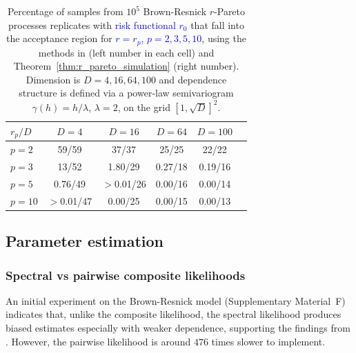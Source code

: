 \documentclass[12pt]{article}
\newcommand{\PZ}{\textcolor{blue}}
\begin{document}
\begin{table}[ht]
    \centering
    \caption{\small Percentage of samples from $10^5$ Brown-Resnick $r$-Pareto processes replicates with \PZ{risk functional $r_0$} that fall into the acceptance region for \PZ{$r=r_p$, $p=2,3,5,10$}, using the methods in \citet{Dombry.etal:2024} (left number in each cell) and Theorem~\ref{thm:r_pareto_simulation} (right number). Dimension is $D=4,16,64,100$ and dependence structure is defined via a power-law semivariogram $\gamma(h)=h/\lambda$, $\lambda=2$, on the grid $[1,\sqrt{D}]^2$.}
    \begin{tabular}{lccccc}
    $r_p/D$ & \phantom{$>$}$D=4$ & \phantom{$>$}$D=16$ & $D=64$ & $D=100$ \\
    \hline
    $p=2$ & \phantom{$>$0.}59/59 & \phantom{$>$0.}37/37 & \phantom{0.}25/25 & \phantom{0.}22/22\\
    $p=3$ & \phantom{$>$0.}13/52 & \phantom{$>$}1.80/29 & 0.27/18 & 0.19/16\\
     $p=5$ & \phantom{$>$}0.76/49 & $>$0.01/26 & 0.00/16 & 0.00/14\\
    $p=10$ & $>$0.01/47 & \phantom{$>$}0.00/25 & 0.00/15 & 0.00/13\\
    \hline
\end{tabular}
    \label{tab:simu_exceedances_p_d}
\end{table}

\subsection{Parameter estimation}
\label{ssec:par_est}

\subsubsection{Spectral vs pairwise composite likelihoods}

An initial experiment on the Brown-Resnick model (Supplementary Material~F) 
indicates that, unlike the composite likelihood, the spectral likelihood produces biased estimates especially with weaker dependence, supporting the findings from \citet{Engelke.etal:2015, Huser.etal:2016}. 
However, the pairwise likelihood 
is around $476$ times slower to implement.
%
\end{document}
